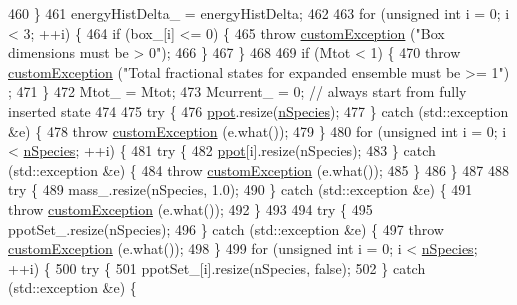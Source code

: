 \begin{DoxyCode}
460     \}
461     energyHistDelta\_ = energyHistDelta;
462 
463     \textcolor{keywordflow}{for} (\textcolor{keywordtype}{unsigned} \textcolor{keywordtype}{int} i = 0; i < 3; ++i) \{
464         \textcolor{keywordflow}{if} (box\_[i] <= 0) \{
465             \textcolor{keywordflow}{throw} \hyperlink{classcustom_exception}{customException} (\textcolor{stringliteral}{"Box dimensions must be > 0"});
466         \}
467     \}
468 
469     \textcolor{keywordflow}{if} (Mtot < 1) \{
470         \textcolor{keywordflow}{throw} \hyperlink{classcustom_exception}{customException} (\textcolor{stringliteral}{"Total fractional states for expanded ensemble must be >= 1"})
      ;
471     \}
472     Mtot\_ = Mtot;
473     Mcurrent\_ = 0; \textcolor{comment}{// always start from fully inserted state}
474 
475     \textcolor{keywordflow}{try} \{
476         \hyperlink{classsim_system_ad2e290b5963f132e6a3a56cee35c8e9f}{ppot}.resize(\hyperlink{classsim_system_ab5e2e9b6204de15520302fe1d51688dd}{nSpecies});
477     \} \textcolor{keywordflow}{catch} (std::exception &e) \{
478         \textcolor{keywordflow}{throw} \hyperlink{classcustom_exception}{customException} (e.what());
479     \}
480     \textcolor{keywordflow}{for} (\textcolor{keywordtype}{unsigned} \textcolor{keywordtype}{int} i = 0; i < \hyperlink{classsim_system_ab5e2e9b6204de15520302fe1d51688dd}{nSpecies}; ++i) \{
481         \textcolor{keywordflow}{try} \{
482             \hyperlink{classsim_system_ad2e290b5963f132e6a3a56cee35c8e9f}{ppot}[i].resize(nSpecies);
483         \} \textcolor{keywordflow}{catch} (std::exception &e) \{
484             \textcolor{keywordflow}{throw} \hyperlink{classcustom_exception}{customException} (e.what());
485         \}
486     \}
487 
488     \textcolor{keywordflow}{try} \{
489         mass\_.resize(nSpecies, 1.0);
490     \} \textcolor{keywordflow}{catch} (std::exception &e) \{
491         \textcolor{keywordflow}{throw} \hyperlink{classcustom_exception}{customException} (e.what());
492     \}
493 
494     \textcolor{keywordflow}{try} \{
495         ppotSet\_.resize(nSpecies);
496     \} \textcolor{keywordflow}{catch} (std::exception &e) \{
497         \textcolor{keywordflow}{throw} \hyperlink{classcustom_exception}{customException} (e.what());
498     \}
499     \textcolor{keywordflow}{for} (\textcolor{keywordtype}{unsigned} \textcolor{keywordtype}{int} i = 0; i < \hyperlink{classsim_system_ab5e2e9b6204de15520302fe1d51688dd}{nSpecies}; ++i) \{
500         \textcolor{keywordflow}{try} \{
501             ppotSet\_[i].resize(nSpecies, \textcolor{keyword}{false});
502         \} \textcolor{keywordflow}{catch} (std::exception &e) \{

\end{DoxyCode}
